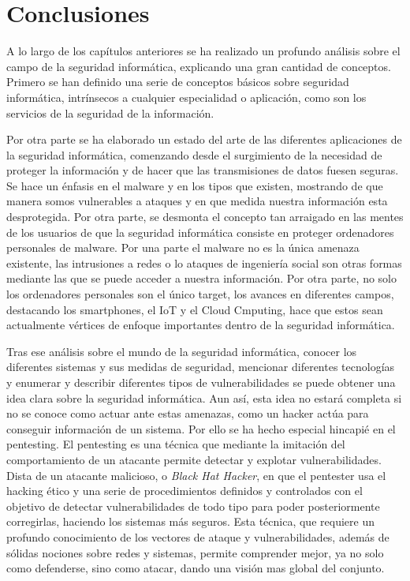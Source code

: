 \chapter{Conclusiones}

A lo largo de los capítulos anteriores se ha realizado un profundo análisis sobre el campo de la seguridad informática, explicando una gran cantidad de conceptos. Primero se han definido una serie de conceptos básicos sobre seguridad informática, intrínsecos a cualquier especialidad o aplicación, como son los servicios de la seguridad de la información.

Por otra parte se ha elaborado un estado del arte de las diferentes aplicaciones de la seguridad informática, comenzando desde el surgimiento de la necesidad de proteger la información y de hacer que las transmisiones de datos fuesen seguras. Se hace un énfasis en el malware y en los tipos que existen, mostrando de que manera somos vulnerables a ataques y en que medida nuestra información esta desprotegida. Por otra parte, se desmonta el concepto tan arraigado en las mentes de los usuarios de que la seguridad informática consiste en proteger ordenadores personales de malware. Por una parte el malware no es la única amenaza existente, las intrusiones a redes o lo ataques de ingeniería social son otras formas mediante las que se puede acceder a nuestra información. Por otra parte, no solo los ordenadores personales son el único target, los avances en diferentes campos, destacando los smartphones, el IoT y el Cloud Cmputing, hace que estos sean actualmente vértices de enfoque importantes dentro de la seguridad informática.

Tras ese análisis sobre el mundo de la seguridad informática, conocer los diferentes sistemas y sus medidas de seguridad, mencionar diferentes tecnologías y enumerar y describir diferentes tipos de vulnerabilidades se puede obtener una idea clara sobre la seguridad informática. Aun así, esta idea no estará completa si no se conoce como actuar ante estas amenazas, como un hacker actúa para conseguir información de un sistema. Por ello se ha hecho especial hincapié en el pentesting. El pentesting es una técnica que mediante la imitación del comportamiento de un atacante permite detectar y explotar vulnerabilidades. Dista de un atacante malicioso, o \textit{Black Hat Hacker}, en que el pentester usa el hacking ético y una serie de procedimientos definidos y controlados con el objetivo de detectar vulnerabilidades de todo tipo para poder posteriormente corregirlas, haciendo los sistemas más seguros. Esta técnica, que requiere un profundo conocimiento de los vectores de ataque y vulnerabilidades, además de sólidas nociones sobre redes y sistemas, permite comprender mejor, ya no solo como defenderse, sino como atacar, dando una visión mas global del conjunto.

